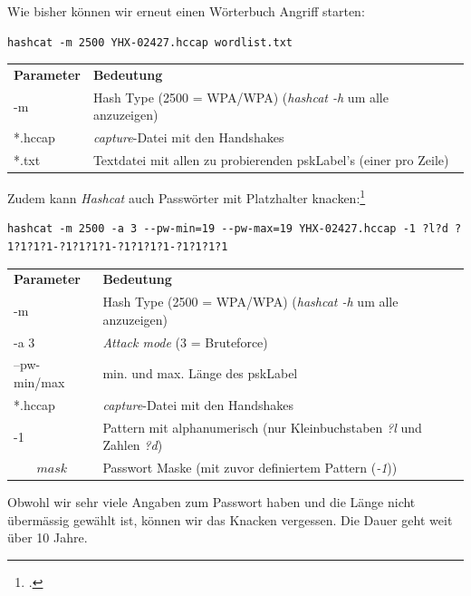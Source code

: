 Wie bisher können wir erneut einen Wörterbuch Angriff starten:
\begin{lstlisting}[style=lstStyleFramed]
hashcat -m 2500 YHX-02427.hccap wordlist.txt
\end{lstlisting}
\begin{tabular}{l l}
	\textbf{Parameter} & \textbf{Bedeutung}\\
	-m & Hash Type (2500 = WPA/WPA) (\textit{hashcat -h} um alle anzuzeigen)\\
	*.hccap & \textit{capture}-Datei mit den Handshakes\\
	*.txt & Textdatei mit allen zu probierenden \gls{pskLabel}'s (einer pro Zeile)\\
\end{tabular}

Zudem kann \textit{Hashcat} auch Passwörter mit Platzhalter knacken:\footcite{mask_attack_hashcat_wiki_2015-04-13}
\begin{lstlisting}[style=lstStyleFramed]
hashcat -m 2500 -a 3 --pw-min=19 --pw-max=19 YHX-02427.hccap -1 ?l?d ?1?1?1?1-?1?1?1?1-?1?1?1?1-?1?1?1?1
\end{lstlisting}
\begin{tabular}{l l}
	\textbf{Parameter} & \textbf{Bedeutung}\\
	-m & Hash Type (2500 = WPA/WPA) (\textit{hashcat -h} um alle anzuzeigen)\\
	-a 3 & \textit{Attack mode} (3 = Bruteforce)\\
	--pw-min/max & min. und max. Länge des \gls{pskLabel}\\
	*.hccap & \textit{capture}-Datei mit den Handshakes\\
	-1 & Pattern mit alphanumerisch (nur Kleinbuchstaben \textit{?l} und Zahlen \textit{?d})\\
	\[mask\] & Passwort Maske (mit zuvor definiertem Pattern (\textit{-1}))\\
\end{tabular}
Obwohl wir sehr viele Angaben zum Passwort haben und die Länge nicht übermässig gewählt ist, können wir das Knacken vergessen.
Die Dauer geht weit über 10 Jahre.





